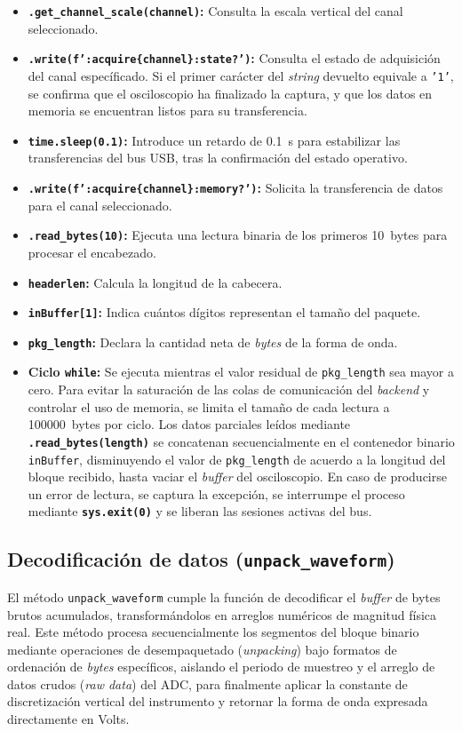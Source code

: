 \begin{itemize}
    \item \textbf{\texttt{.get\_channel\_scale(channel)}:} Consulta la escala vertical del canal seleccionado.
    \item \textbf{\texttt{.write(f':acquire\{channel\}:state?')}:} Consulta el estado de adquisición del canal específicado. Si el primer carácter del \textit{string} devuelto equivale a \texttt{'1'}, se confirma que el osciloscopio ha finalizado la captura, y que los datos en memoria se encuentran listos para su transferencia.
    \item \textbf{\texttt{time.sleep(0.1)}:} Introduce un retardo de \SI{0.1}{\second} para estabilizar las transferencias del bus USB, tras la confirmación del estado operativo.
    \item \textbf{\texttt{.write(f':acquire\{channel\}:memory?')}:} Solicita la transferencia de datos para el canal seleccionado.
    \item \textbf{\texttt{.read\_bytes(10)}:} Ejecuta una lectura binaria de los primeros \SI{10}{bytes} para procesar el encabezado.
    \item \textbf{\texttt{headerlen}:} Calcula la longitud de la cabecera.
    \item \textbf{\texttt{inBuffer[1]}:} Indica cuántos dígitos representan el tamaño del paquete.
    \item \textbf{\texttt{pkg\_length}:} Declara la cantidad neta de \textit{bytes} de la forma de onda.
    \item \textbf{Ciclo \texttt{while}:} Se ejecuta mientras el valor residual de \texttt{pkg\_length} sea mayor a cero. Para evitar la saturación de las colas de comunicación del \textit{backend} y controlar el uso de memoria, se limita el tamaño de cada lectura a \SI{100000}{bytes} por ciclo. Los datos parciales leídos mediante \textbf{\texttt{.read\_bytes(length)}} se concatenan secuencialmente en el contenedor binario \texttt{inBuffer}, disminuyendo el valor de \texttt{pkg\_length} de acuerdo a la longitud del bloque recibido, hasta vaciar el \textit{buffer} del osciloscopio. En caso de producirse un error de lectura, se captura la excepción, se interrumpe el proceso mediante \textbf{\texttt{sys.exit(0)}} y se liberan las sesiones activas del bus.
\end{itemize}

\subsection{Decodificación de datos (\texttt{unpack\_waveform})}
El método \texttt{unpack\_waveform} cumple la función de decodificar el \textit{buffer} de bytes brutos acumulados, transformándolos en arreglos numéricos de magnitud física real. Este método procesa secuencialmente los segmentos del bloque binario mediante operaciones de desempaquetado (\textit{unpacking}) bajo formatos de ordenación de \textit{bytes} específicos, aislando el periodo de muestreo y el arreglo de datos crudos (\textit{raw data}) del ADC, para finalmente aplicar la constante de discretización vertical del instrumento y retornar la forma de onda expresada directamente en Volts.

